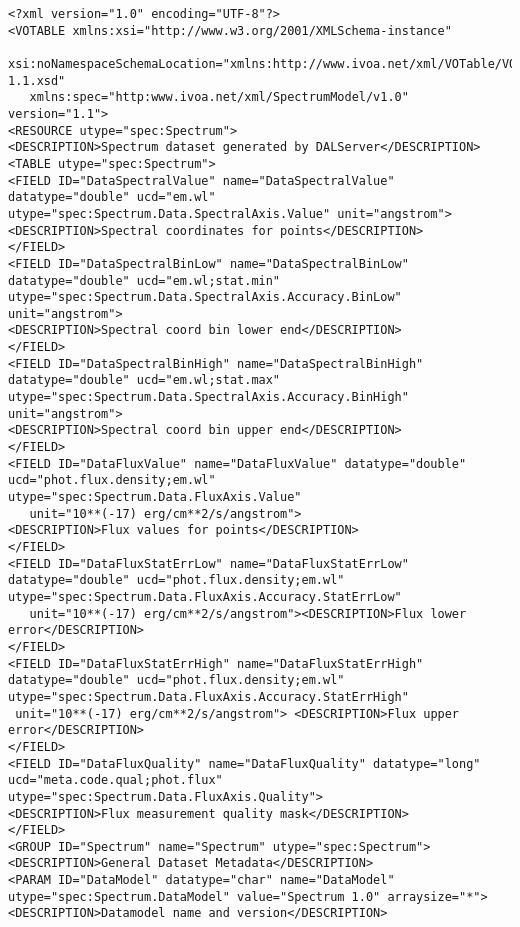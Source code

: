 \begin{landscape}
{\scriptsize
\begin{flushleft}
\begin{fmlpage}

\begin{verbatim}
<?xml version="1.0" encoding="UTF-8"?>
<VOTABLE xmlns:xsi="http://www.w3.org/2001/XMLSchema-instance"
   xsi:noNamespaceSchemaLocation="xmlns:http://www.ivoa.net/xml/VOTable/VOTable-1.1.xsd" 
   xmlns:spec="http:www.ivoa.net/xml/SpectrumModel/v1.0" version="1.1">
<RESOURCE utype="spec:Spectrum">
<DESCRIPTION>Spectrum dataset generated by DALServer</DESCRIPTION>
<TABLE utype="spec:Spectrum">
<FIELD ID="DataSpectralValue" name="DataSpectralValue" datatype="double" ucd="em.wl" utype="spec:Spectrum.Data.SpectralAxis.Value" unit="angstrom">
<DESCRIPTION>Spectral coordinates for points</DESCRIPTION>
</FIELD>
<FIELD ID="DataSpectralBinLow" name="DataSpectralBinLow" datatype="double" ucd="em.wl;stat.min" utype="spec:Spectrum.Data.SpectralAxis.Accuracy.BinLow" unit="angstrom">
<DESCRIPTION>Spectral coord bin lower end</DESCRIPTION>
</FIELD>
<FIELD ID="DataSpectralBinHigh" name="DataSpectralBinHigh" datatype="double" ucd="em.wl;stat.max" utype="spec:Spectrum.Data.SpectralAxis.Accuracy.BinHigh" unit="angstrom">
<DESCRIPTION>Spectral coord bin upper end</DESCRIPTION>
</FIELD>
<FIELD ID="DataFluxValue" name="DataFluxValue" datatype="double" ucd="phot.flux.density;em.wl" utype="spec:Spectrum.Data.FluxAxis.Value" 
   unit="10**(-17) erg/cm**2/s/angstrom">
<DESCRIPTION>Flux values for points</DESCRIPTION>
</FIELD>
<FIELD ID="DataFluxStatErrLow" name="DataFluxStatErrLow" datatype="double" ucd="phot.flux.density;em.wl" utype="spec:Spectrum.Data.FluxAxis.Accuracy.StatErrLow"
   unit="10**(-17) erg/cm**2/s/angstrom"><DESCRIPTION>Flux lower error</DESCRIPTION>
</FIELD>
<FIELD ID="DataFluxStatErrHigh" name="DataFluxStatErrHigh" datatype="double" ucd="phot.flux.density;em.wl" utype="spec:Spectrum.Data.FluxAxis.Accuracy.StatErrHigh"
 unit="10**(-17) erg/cm**2/s/angstrom"> <DESCRIPTION>Flux upper error</DESCRIPTION>
</FIELD>
<FIELD ID="DataFluxQuality" name="DataFluxQuality" datatype="long" ucd="meta.code.qual;phot.flux" utype="spec:Spectrum.Data.FluxAxis.Quality">
<DESCRIPTION>Flux measurement quality mask</DESCRIPTION>
</FIELD>
<GROUP ID="Spectrum" name="Spectrum" utype="spec:Spectrum">
<DESCRIPTION>General Dataset Metadata</DESCRIPTION>
<PARAM ID="DataModel" datatype="char" name="DataModel" utype="spec:Spectrum.DataModel" value="Spectrum 1.0" arraysize="*">
<DESCRIPTION>Datamodel name and version</DESCRIPTION>

\end{verbatim}
\end{fmlpage}
\end{flushleft}}
\end{landscape}
